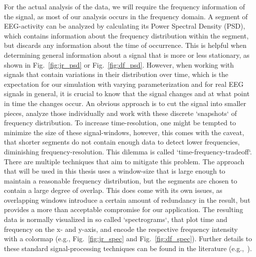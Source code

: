 For the actual analysis of the data,
we will require the frequency information of the signal,
as most of our analysis occurs in the frequency domain.
A segment of EEG-activity can be analyzed by calculating its
Power Spectral Density (PSD),
which contains information about the frequency distribution within the segment,
but discards any information about the time of occurrence.
This is helpful when determining general information about a signal that is more or less stationary,
as shown in Fig.~\ref{fig:jr_psd} or Fig.~\ref{fig:df_psd}.
However, when working with signals that contain variations in their distribution over time,
which is the expectation for our simulation with varying parameterization and for real EEG signals in general,
it is crucial to know that the signal changes and at what point in time the changes occur.
An obvious approach is to cut the signal into smaller pieces,
analyze those individually and work with these discrete `snapshots` of frequency distribution.
To increase time-resolution, one might be tempted to minimize the size of these signal-windows,
however, this comes with the caveat,
that shorter segments do not contain enough data to detect lower frequencies,
diminishing frequency-resolution.
This dilemma is called `time-frequency-tradeoff`.
There are multiple techniques that aim to mitigate this problem.
The approach that will be used in this thesis uses a window-size that is large enough to maintain a reasonable
frequency distribution, but the segments are chosen to contain a large degree of overlap.
This does come with its own issues, as overlapping windows introduce a certain amount of redundancy in the result,
but provides a more than acceptable compromise for our application.
The resulting data is normally visualized in so called `spectrograms`,
that plot time and frequency on the x- and y-axis,
and encode the respective frequency intensity with a colormap (e.g., Fig.~\ref{fig:jr_spec}
and Fig.~\ref{fig:df_spec}).
Further details to these standard signal-processing techniques can be
found in the literature (e.g.,~\cite{mecarelli_clinical_2019}).

